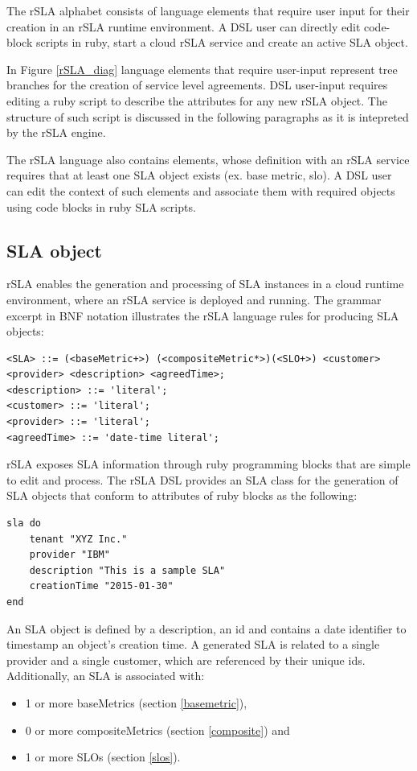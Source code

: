 \documentclass{llncs}
\begin{document}
The rSLA alphabet consists of language elements that require user input for their creation in an rSLA runtime environment. A DSL user can directly edit code-block scripts in ruby, start a cloud rSLA service and create an active SLA object. 

In Figure \ref{rSLA_diag} language elements that require user-input represent tree branches for the creation of service level agreements. DSL user-input requires editing a ruby script to describe the attributes for any new rSLA object. The structure of such script is discussed in the following paragraphs as it is intepreted by the rSLA engine.

The rSLA language also contains elements, whose definition with an rSLA service requires that at least one SLA object exists (ex. base metric, slo). A DSL user can edit the context of such elements and associate them with required objects using code blocks in ruby SLA scripts.

\subsection{SLA object}\label{slaobject}

rSLA enables the generation and processing of SLA instances in a cloud runtime environment, where an rSLA service is deployed and running. The grammar excerpt in BNF notation illustrates the rSLA language rules for producing SLA objects:
\begin{lstlisting}[breaklines, firstnumber=auto, caption=$<SLA>$ BNF grammar]
  <SLA> ::= (<baseMetric+>) (<compositeMetric*>)(<SLO+>) <customer> <provider> <description> <agreedTime>;
<description> ::= 'literal';
<customer> ::= 'literal';
<provider> ::= 'literal';
<agreedTime> ::= 'date-time literal';
\end{lstlisting}
rSLA exposes SLA information through ruby programming blocks that are simple to edit and process.
The rSLA DSL provides an SLA class for the generation of SLA objects that conform to attributes of ruby blocks as the following:
\begin{lstlisting}[caption=rSLA SLA definition, label=SLAlst]
sla do
  	tenant "XYZ Inc." 
  	provider "IBM"
  	description "This is a sample SLA"
  	creationTime "2015-01-30"
end 
\end{lstlisting}

An SLA object is defined by a description, an id and contains a date identifier to timestamp an object's creation time. A generated SLA is related to a single provider and a single customer, which are referenced by their unique ids. Additionally, an SLA is associated with:
\begin{itemize}[noitemsep,nolistsep]
\item 1 or more baseMetrics (section \ref{basemetric}), 
\item 0 or more compositeMetrics (section \ref{composite}) and
\item 1 or more SLOs (section \ref{slos}).
\end{itemize}  
\end{document}
